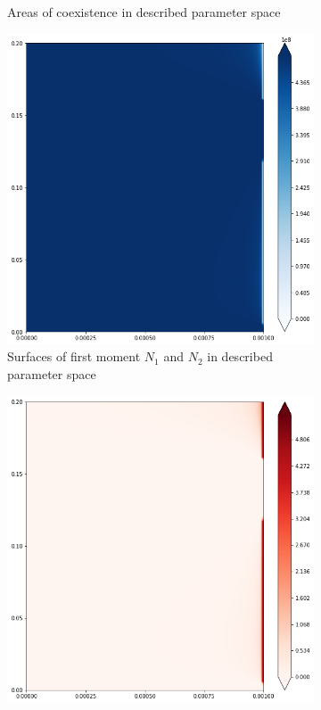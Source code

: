 \begin{figure}
\begin{subfigure}{.5\textwidth}
		\caption{Areas of coexistence in described parameter space}
		\label{fig:cctod3:sub2}
	\end{subfigure}
\centering
\begin{subfigure}{.5\textwidth}
	\centering
	\includegraphics[width=.95\linewidth]{ccto_d3_n2.png}
	\caption{Surfaces of first moment \(N_1\) and \(N_2\) in described parameter space}
	\label{fig:cctod3:sub3}
\end{subfigure}%
\begin{subfigure}{.5\textwidth}
	\centering
	\includegraphics[width=.95\linewidth]{ccto_d3_n1.png}

\end{subfigure}
\end{figure}

